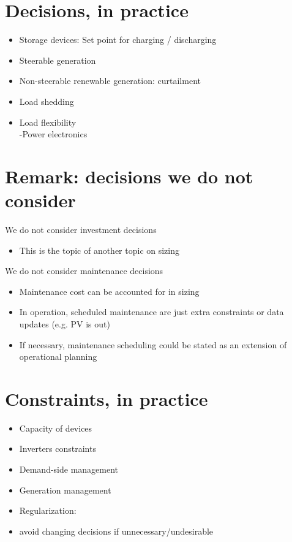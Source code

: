 \documentclass[10pt]{article}
\begin{document}
\section*{Decisions, in practice}
\begin{itemize}
  \item Storage devices: Set point for charging / discharging
  \item Steerable generation
  \item Non-steerable renewable generation: curtailment
  \item Load shedding
  \item Load flexibility\\
-Power electronics
\end{itemize}

\section*{Remark: decisions we do not consider}
We do not consider investment decisions

\begin{itemize}
  \item This is the topic of another topic on sizing
\end{itemize}

We do not consider maintenance decisions

\begin{itemize}
  \item Maintenance cost can be accounted for in sizing
  \item In operation, scheduled maintenance are just extra constraints or data updates (e.g. PV is out)
  \item If necessary, maintenance scheduling could be stated as an extension of operational planning
\end{itemize}

\section*{Constraints, in practice}
\begin{itemize}
  \item Capacity of devices
  \item Inverters constraints
  \item Demand-side management
  \item Generation management
  \item Regularization:
  \item avoid changing decisions if unnecessary/undesirable
\end{itemize}
\end{document}
